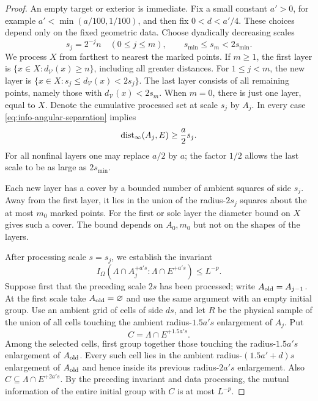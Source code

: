 \begin{proof}
An empty target or exterior is immediate.  Fix a small constant
$a'>0$, for example $a'<\min(a/100,1/100)$, and then fix
$0<d<a'/4$.  These choices depend only on the fixed geometric data.
Choose dyadically decreasing scales
\[
 s_j=2^{-j}n\quad(0\le j\le m),
 \qquad s_{\min}\le s_m<2s_{\min}.
\]
We process $X$ from farthest to nearest the marked points.  If $m\ge1$,
the first layer is $\{x\in X:d_{\mathcal V}(x)\ge n\}$, including all
greater distances.  For $1\le j<m$, the new layer is
$\{x\in X:s_j\le d_{\mathcal V}(x)<2s_j\}$.  The last layer consists
of all remaining points, namely those with
$d_{\mathcal V}(x)<2s_m$.  When $m=0$, there is just one layer, equal
to $X$.  Denote the cumulative processed set at scale $s_j$ by $A_j$.
In every case \eqref{eq:info-angular-separation} implies
\begin{equation}
 \operatorname{dist}_\infty(A_j,E)\ge \frac a2 s_j.
 \label{eq:info-cumulative-separation}
\end{equation}
For all nonfinal layers one may replace $a/2$ by $a$; the factor $1/2$
allows the last scale to be as large as $2s_{\min}$.

Each new layer has a cover by a bounded number of ambient squares of
side $s_j$.  Away from the first layer, it lies in the union of the
radius-$2s_j$ squares about the at most $m_0$ marked points.  For the
first or sole layer the diameter bound on $X$ gives such a cover.
The bound depends on $A_0,m_0$ but not on the shapes of the layers.

After processing scale $s=s_j$, we establish the invariant
\begin{equation}
 I_\Omega(\Lambda\cap A_j^{+a's}:\Lambda\cap E^{+a's})\le L^{-p}.
 \label{eq:info-annular-invariant}
\end{equation}
Suppose first that the preceding scale $2s$ has been processed; write
$A_{\rm old}=A_{j-1}$.  At the first scale take
$A_{\rm old}=\varnothing$ and use the same argument with an empty
initial group.  Use an ambient grid of cells of side $ds$, and let
$R$ be the physical sample of the union of all cells touching the
ambient radius-$1.5a's$ enlargement of $A_j$.  Put
\[
 C=\Lambda\cap E^{+1.5a's}.
\]
Among the selected cells, first group together those touching the
radius-$1.5a's$ enlargement of $A_{\rm old}$.  Every such cell lies in
the ambient radius-$(1.5a'+d)s$ enlargement of $A_{\rm old}$ and hence
inside its previous radius-$2a's$ enlargement.  Also
$C\subseteq\Lambda\cap E^{+2a's}$.  By the preceding invariant and data
processing, the mutual information of the entire initial group with
$C$ is at most $L^{-p}$.


\end{proof}
